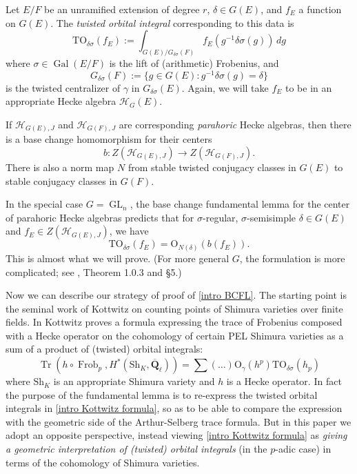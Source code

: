 \documentclass[reqno]{amsart}
\numberwithin{equation}{section}
\newcommand{\Q}{\mathbf{Q}}
\newcommand{\Gal}{\operatorname{Gal}}
\newcommand{\ol}[1]{\overline{#1}}
\newcommand{\Cal}[1]{\mathcal{#1}}
\newcommand{\co}{\colon}
\newcommand{\mrm}[1]{\mathrm{#1}}
\DeclareMathOperator{\GL}{GL}
\DeclareMathOperator{\Frob}{Frob}
\DeclareMathOperator{\Tr}{Tr}
\theoremstyle{remark}
\numberwithin{equation}{section}
\begin{document}
 Let $E/F$ be an unramified extension of degree $r$, $\delta \in G(E)$, and $f_E$ a function on $G(E)$. The \emph{twisted orbital integral} corresponding to this data is 
 \begin{equation}\label{twisted orbital integral}
 \mrm{TO}_{\delta \sigma}(f_E)  := \int_{G(E)/G_{\delta \sigma}(F)} f_E(g^{-1} \delta \sigma (g)) \, dg
 \end{equation}
 where $\sigma \in \Gal(E/F)$ is the lift of (arithmetic) Frobenius, and 
 \[
 G_{\delta \sigma}(F)  := \{ g \in G(E) \co g^{-1} \delta \sigma(g) = \delta\}
 \]
 is the twisted centralizer of $\gamma$ in $G_{\delta \sigma}(E)$. Again, we will take $f_E$ to be in an appropriate Hecke algebra $\Cal{H}_G(E)$.
 
 If $\Cal{H}_{G(E),J}$ and $\Cal{H}_{G(F),J}$ are corresponding \emph{parahoric} Hecke algebras, then there is a base change homomorphism for their centers
 \[
 b  \co Z(\Cal{H}_{G(E),J}) \rightarrow Z(\Cal{H}_{G(F),J}).
 \]
 There is also a norm map $N$ from stable twisted conjugacy classes in $G(E)$ to stable conjugacy classes in $G(F)$. 
 
In the special case $G =\GL_n$, the base change fundamental lemma for the center of parahoric Hecke algebras predicts that for $\sigma$-regular, $\sigma$-semisimple $\delta \in G(E)$ and $f_E \in Z(\Cal{H}_{G(E),J})$, we have 
 \begin{equation}\label{intro BCFL}
  \mrm{TO}_{\delta \sigma}(f_E) = \mrm{O}_{N(\delta)} (b(f_E)).
 \end{equation}
This is almost what we will prove. (For more general $G$, the formulation is more complicated; see \cite{Haines09}, Theorem 1.0.3 and \S 5.) 
 
 Now we can describe our strategy of proof of \eqref{intro BCFL}. The starting point is the seminal work of Kottwitz on counting points of Shimura varieties over finite fields. In \cite{Kott92} Kottwitz proves a formula expressing the trace of Frobenius composed with a Hecke operator on the cohomology of certain PEL Shimura varieties as a sum of a product of (twisted) orbital integrals: 
\begin{equation}\label{intro Kottwitz formula}
\Tr(h \circ \Frob_p, H^*(\mrm{Sh}_K, \ol{\Q}_{\ell})) = \sum (\ldots) \mrm{O}_{\gamma} (h^p) \mrm{TO}_{\delta \sigma}(h_p)
\end{equation}
where $\mrm{Sh}_K$ is an appropriate Shimura variety and $h$ is a Hecke operator. In fact the purpose of the fundamental lemma is to re-express the twisted orbital integrals in \eqref{intro Kottwitz formula}, so as to be able to compare the expression with the geometric side of the Arthur-Selberg trace formula. But in this paper we adopt an opposite perspective, instead viewing \eqref{intro Kottwitz formula} as  \emph{giving a geometric interpretation of (twisted) orbital integrals} (in the $p$-adic case) in terms of the cohomology of Shimura varieties. 
\end{document}
